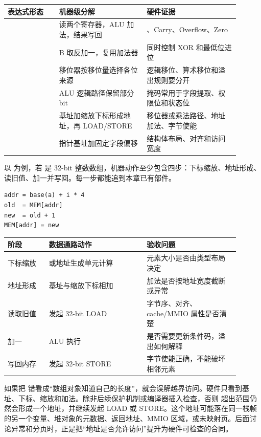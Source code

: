 \begin{longtable}{L{0.2\linewidth}L{0.34\linewidth}L{0.36\linewidth}}
\toprule
表达式形态 & 机器级分解 & 硬件证据 \\
\midrule
{} & 读两个寄存器，ALU 加法，结果写回 & 、Carry、Overflow、Zero \\
 & B 取反加一，复用加法器 &  同时控制 XOR 和最低位进位 \\
 & 移位器按移位量选择各位来源 & 逻辑移位、算术移位和溢出规则要分开 \\
 & ALU 逻辑路径保留部分 bit & 掩码常用于字段提取、权限位和状态位 \\
 & 基址加缩放下标形成地址，再 LOAD/STORE & 移位器或乘法路径、地址加法、字节使能 \\
 & 指针基址加固定字段偏移 & 结构体布局、对齐和访问宽度 \\
\bottomrule
\end{longtable}

以  为例，若  是 32-bit 整数数组，机器动作至少包含四步：下标缩放、地址形成、读旧值、加一并写回。每一步都能追到本章已有部件。

\begin{lstlisting}
addr = base(a) + i * 4
old  = MEM[addr]
new  = old + 1
MEM[addr] = new
\end{lstlisting}

\begin{longtable}{L{0.16\linewidth}L{0.38\linewidth}L{0.36\linewidth}}
\toprule
阶段 & 数据通路动作 & 验收问题 \\
\midrule
下标缩放 &  或地址生成单元计算  & 元素大小是否由类型布局决定 \\
地址形成 & 基址与缩放下标相加 & 加法是否按地址宽度截断或异常 \\
读取旧值 & 发起 32-bit LOAD & 字节序、对齐、cache/MMIO 属性是否清楚 \\
加一 & ALU 执行  & 是否需要更新条件码，溢出如何解释 \\
写回内存 & 发起 32-bit STORE & 字节使能正确，不能破坏相邻元素 \\
\bottomrule
\end{longtable}

如果把  错看成“数组对象知道自己的长度”，就会误解越界访问。硬件只看到基址、下标、缩放和加法。除非后续保护机制或编译器插入检查，否则  超出范围仍然会形成一个地址，并继续发起 LOAD 或 STORE。这个地址可能落在同一栈帧的另一个变量、堆对象的元数据、返回地址、MMIO 区域，或未映射页。后面讨论异常和分页时，正是把“地址是否允许访问”提升为硬件可检查的合同。

